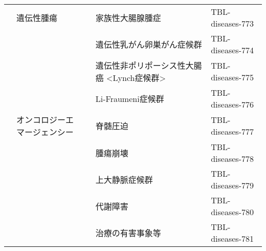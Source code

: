 \begin{xltabular}{\linewidth}{XXXXX}
 & 遺伝性腫瘍 &  & 家族性大腸腺腫症 & TBL-diseases-773 \\
 &  &  & 遺伝性乳がん卵巣がん症候群 & TBL-diseases-774 \\
 &  &  & 遺伝性非ポリポーシス性大腸癌 <Lynch症候群> & TBL-diseases-775 \\
 &  &  & Li-Fraumeni症候群 & TBL-diseases-776 \\
 & オンコロジーエマージェンシー &  & 脊髄圧迫 & TBL-diseases-777 \\
 &  &  & 腫瘍崩壊 & TBL-diseases-778 \\
 &  &  & 上大静脈症候群 & TBL-diseases-779 \\
 &  &  & 代謝障害 & TBL-diseases-780 \\
 &  &  & 治療の有害事象等 & TBL-diseases-781 \\
\bottomrule
\end{xltabular}

